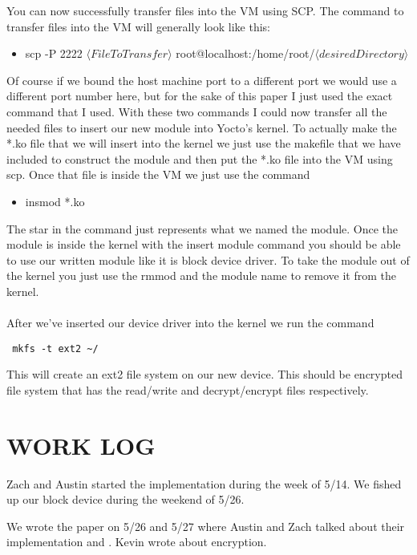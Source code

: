 \documentclass[onecolumn, draftclsnofoot,10pt, compsoc]{IEEEtran}
\begin{document}
    You can now successfully transfer files into the VM using SCP. The command to transfer files into the VM will generally look like this:
    
    \begin{itemize}
        \item scp -P 2222 $\langle File To Transfer \rangle$ root@localhost:/home/root/$\langle desired Directory \rangle$
    \end{itemize}
    
    Of course if we bound the host machine port to a different port we would use a different port number here, but for the sake of this paper I just used the exact command that I used. With these two commands I could now transfer all the needed files to insert our new module into Yocto's kernel. To actually make the *.ko file that we will insert into the kernel we just use the makefile that we have included to construct the module and then put the *.ko file into the VM using scp. Once that file is inside the VM we just use the command 
    
    \begin{itemize}
        \item insmod *.ko
    \end{itemize}
    
    
    The star in the command just represents what we named the module. Once the module is inside the kernel with the insert module command you should be able to use our written module like it is block device driver. To take the module out of the kernel you just use the rmmod and the module name to remove it from the kernel.\\
   \\ After we've inserted our device driver into the kernel we run the command \begin{verbatim} mkfs -t ext2 ~/ \end{verbatim} This will create an ext2 file system on our new device. This should be encrypted file system that has the read/write and decrypt/encrypt files respectively.
    
    \section{WORK LOG}
    Zach and Austin started the implementation during the week of 5/14. We fished up our block device during the weekend of 5/26.
    
    We wrote the paper on 5/26 and 5/27 where Austin and Zach talked about their implementation and . Kevin wrote about encryption.
    
\end{document}
